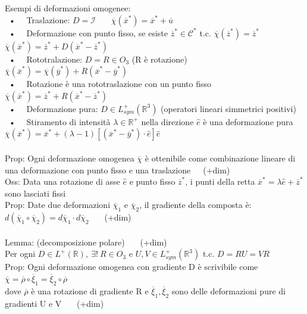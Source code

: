 \documentclass{article}
\theoremstyle{unnumbered}
\theoremstyle{unnumbered1}
\begin{document}
%
Esempi di deformazioni omogenee:\\
\ • \ \ Traslazione: $D=\mathcal{I}$ \ \ \ $\overline{\chi}(\overline{x}^*)=\overline{x}^*+\overline{u} $ \\
\ • \ \ Deformazione con punto fisso, se esiste $\overline{z}^*\in\mathcal{C}^*$ t.c. $\overline{\chi}(\overline{z}^*)=\overline{z}^*$ \ \ \  $\overline{\chi}(\overline{x}^*)=\overline{z}^*+D(\overline{x}^*-\overline{z}^*)$ \\
\ • \ \ Rototralazione: $D=R\in O_3$ (R è rotazione)\ \ \  $\overline{\chi}(\overline{x}^*)=\overline{\chi}(\overline{y}^*)+R(\overline{x}^*-\overline{y}^*)$\\
\ • \ \ Rotazione è una rototraslazione con un punto fisso \ \ \  $\overline{\chi}(\overline{x}^*)=\overline{z}^*+R(\overline{x}^*-\overline{z}^*)$\\
\ • \ \ Deformazione pura: $D\in L_{sym}^+(\mathbb{R}^3)$ (operatori lineari simmetrici positivi) \\
%
\ • \ \ Stiramento di intensità $\lambda\in\mathbb{R}^+$ nella direzione $\hat{e}$ è una deformazione pura $\overline{\chi}(\overline{x}^*)=\overline{x}^*+(\lambda-1)[(\overline{x}^*-\overline{y}^*)\cdot\hat{e}]\hat{e}$\\ \\
%
Prop: Ogni deformazione omogenea $\overline{\chi}$ è ottenibile come combinazione lineare di\\
\phantom{Prop: }una deformazione con punto fisso e una traslazione\ \ \ (+dim)\\
%
Oss: Data una rotazione di asse $\hat{e}$ e punto fisso $\overline{z}^*$, i punti della retta $\overline{x}^*=\lambda\hat{e}+\overline{z}^*$ sono lasciati fissi\\
%
%
%
Prop: Date due deformazioni $\overline{\chi}_1$ e $\overline{\chi}_2$, il gradiente della composta è: \ $d(\overline{\chi}_1\circ\overline{\chi}_2)=d\overline{\chi}_1\cdot d\overline{\chi}_2$ \ \ \ (+dim)\\ \\
%
%
%
Lemma: (decomposizione polare) \ \ \ (+dim)\\
Per ogni $D\in L^+(\mathbb{R}),\ \exists!\ R \in O_3 \text{ e } U,V\in L_{sym}^+(\mathbb{R}^3)$ t.c. $D=RU=VR$ \\
%
Prop: Ogni deformazione omogenea con gradiente D è scrivibile come $\overline{\chi}=\overline{\rho}\circ\overline{\xi}_1=\overline{\xi}_2\circ\overline{\rho}$ \\
\phantom{Prop: }dove $\overline{\rho}$ è una rotazione di gradiente R e $\overline{\xi}_1, \overline{\xi}_2$ sono delle deformazioni pure di gradienti U e V \ \ \ (+dim)\\ \\
\end{document}
